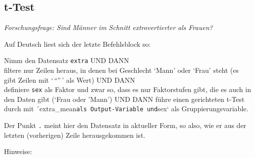 \documentclass[12pt,ngerman,]{book}
\makeatletter
\newenvironment{Shaded}{\begin{snugshade}}{\end{snugshade}}
\newcommand{\KeywordTok}[1]{\textcolor[rgb]{0.13,0.29,0.53}{\textbf{#1}}}
\newcommand{\DataTypeTok}[1]{\textcolor[rgb]{0.13,0.29,0.53}{#1}}
\newcommand{\StringTok}[1]{\textcolor[rgb]{0.31,0.60,0.02}{#1}}
\newcommand{\CommentTok}[1]{\textcolor[rgb]{0.56,0.35,0.01}{\textit{#1}}}
\newcommand{\OperatorTok}[1]{\textcolor[rgb]{0.81,0.36,0.00}{\textbf{#1}}}
\newcommand{\NormalTok}[1]{#1}
\newenvironment{kframe}{%
\medskip{}
\setlength{\fboxsep}{.8em}
 \def\at@end@of@kframe{}%
 \ifinner\ifhmode%
  \def\at@end@of@kframe{\end{minipage}}%
  \begin{minipage}{\columnwidth}%
 \fi\fi%
 \def\FrameCommand##1{\hskip\@totalleftmargin \hskip-\fboxsep
 \colorbox{shadecolor}{##1}\hskip-\fboxsep
     \hskip-\linewidth \hskip-\@totalleftmargin \hskip\columnwidth}%
 \MakeFramed {\advance\hsize-\width
   \@totalleftmargin\z@ \linewidth\hsize
   \@setminipage}}%
 {\par\unskip\endMakeFramed%
 \at@end@of@kframe}
\renewenvironment{Shaded}{\begin{kframe}}{\end{kframe}}
\theoremstyle{definition}
\theoremstyle{definition}
\theoremstyle{remark}
\let\BeginKnitrBlock\begin \let\EndKnitrBlock\end
\makeatother
\begin{document}
\subsection{t-Test}\label{t-test}

\emph{Forschungsfrage: Sind Männer im Schnitt extrovertierter als
Frauen?}

\begin{Shaded}
\end{Shaded}

Auf Deutsch liest sich der letzte Befehlsblock so:

\BeginKnitrBlock{rmdpseudocode}
Nimm den Datensatz \texttt{extra} UND DANN\\
filtere nur Zeilen heraus, in denen bei Geschlecht `Mann' oder `Frau'
steht (es gibt Zeilen mit `\,``''\,' als Wert) UND DANN\\
definiere \texttt{sex} als Faktor und zwar so, dass es nur Faktorstufen
gibt, die es auch in den Daten gibt (`Frau oder 'Mann') UND DANN führe
einen gerichteten t-Test durch mit
´extra\_mean\texttt{als\ Output-Variable\ und}sex` als
Gruppierungsvariable.
\EndKnitrBlock{rmdpseudocode}

Der Punkt \texttt{.} meint hier den Datensatz in aktueller Form, so
also, wie er aus der letzten (vorherigen) Zeile herausgekommen ist.

Hinweise:
\end{document}
